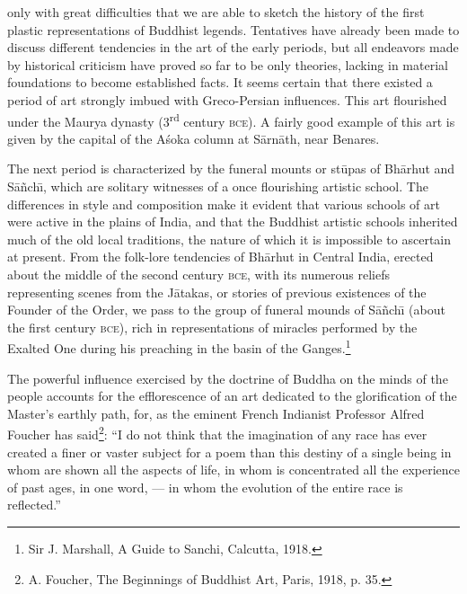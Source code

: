 \documentclass[a4paper, 12pt, oneside]{article}
\begin{document}
only with great difficulties that we are able to sketch the history of the first plastic representations of Buddhist legends. Tentatives have already been made to discuss different tendencies in the art of the early periods, but all endeavors made by historical criticism have proved so far to be only theories, lacking in material foundations to become established facts. It seems certain that there existed a period of art strongly imbued with Greco-Persian influences. This art flourished under the Maurya dynasty (3\textsuperscript{rd} century \textsc{bce}). A fairly good example of this art is given by the capital of the A\'{s}oka column at S\={a}rn\={a}th, near Benares.

The next period is characterized by the funeral mounts or st\={u}pas of Bh\={a}rhut and S\={a}\~{n}ch\={\i}, which are solitary witnesses of a once flourishing artistic school. The differences in style and composition make it evident that various schools of art were active in the plains of India, and that the Buddhist artistic schools inherited much of the old local traditions, the nature of which it is impossible to ascertain at present. From the folk-lore tendencies of Bh\={a}rhut in Central India, erected about the middle of the second century \textsc{bce}, with its numerous reliefs representing scenes from the J\={a}takas, or stories of previous existences of the Founder of the Order, we pass to the group of funeral mounds of S\={a}\~{n}ch\={\i} (about the first century \textsc{bce}), rich in representations of miracles performed by the Exalted One during his preaching in the basin of the Ganges.\footnote{Sir J. Marshall, A Guide to Sanchi, Calcutta, 1918.}

The powerful influence exercised by the doctrine of Buddha on the minds of the people accounts for the efflorescence of an art dedicated to the glorification of the Master's earthly path, for, as the eminent French Indianist Professor Alfred Foucher has said\footnote{A. Foucher, The Beginnings of Buddhist Art, Paris, 1918, p. 35.}: ``I do not think that the imagination of any race has ever created a finer or vaster subject for a poem than this destiny of a single being in whom are shown all the aspects of life, in whom is concentrated all the experience of past ages, in one word, --- in whom the evolution of the entire race is reflected.''
\end{document}
